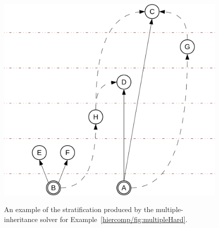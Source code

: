 \begin{figure}[tp]
\begin{minipage}[b]{0.5\linewidth}
    \includegraphics[scale=0.4]{figures/complementation/steps-5.pdf}
    \label{hiercomp/fig:multiple:steps:5}
  \end{minipage}
  \caption[Stratification Example]{An example of the stratification
    produced by the multiple-inheritance solver for
    Example~\ref{hiercomp/fig:multipleHard}.}
  \label{hiercomp/fig:multiple:steps}
\end{figure}




